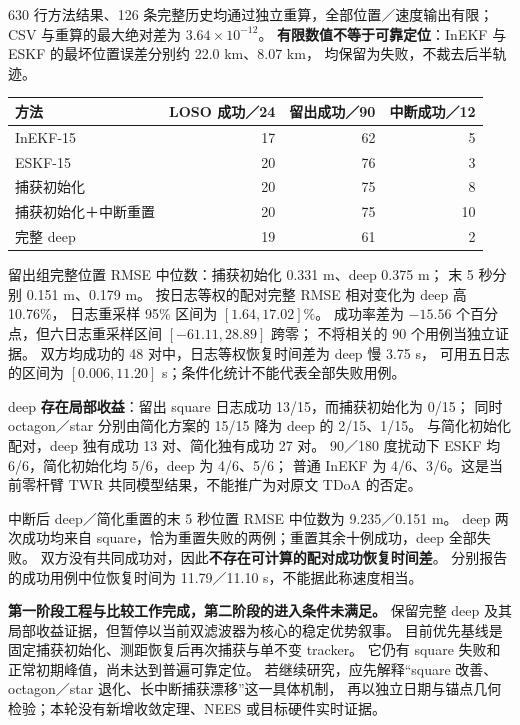 630 行方法结果、126 条完整历史均通过独立重算，全部位置／速度输出有限；
CSV 与重算的最大绝对差为 $3.64\times10^{-12}$。
\textbf{有限数值不等于可靠定位}：InEKF 与 ESKF 的最坏位置误差分别约 22.0 km、8.07 km，
均保留为失败，不裁去后半轨迹。

\begin{center}
\begin{tabular}{lrrr}
\toprule
方法&LOSO 成功／24&留出成功／90&中断成功／12\\\midrule
InEKF-15&17&62&5\\
ESKF-15&20&76&3\\
捕获初始化&20&75&8\\
捕获初始化＋中断重置&20&75&10\\
完整 deep&19&61&2\\\bottomrule
\end{tabular}
\end{center}

留出组完整位置 RMSE 中位数：捕获初始化 0.331 m、deep 0.375 m；
末 5 秒分别 0.151 m、0.179 m。
按日志等权的配对完整 RMSE 相对变化为 deep 高 10.76\%，
日志重采样 95\% 区间为 $[1.64,17.02]\%$。
成功率差为 $-15.56$ 个百分点，但六日志重采样区间 $[-61.11,28.89]$ 跨零；
不将相关的 90 个用例当独立证据。
双方均成功的 48 对中，日志等权恢复时间差为 deep 慢 3.75 s，
可用五日志的区间为 $[0.006,11.20]$ s；条件化统计不能代表全部失败用例。

deep \textbf{存在局部收益}：留出 square 日志成功 13/15，而捕获初始化为 0/15；
同时 octagon／star 分别由简化方案的 15/15 降为 deep 的 2/15、1/15。
与简化初始化配对，deep 独有成功 13 对、简化独有成功 27 对。
90／180 度扰动下 ESKF 均 6/6，简化初始化均 5/6，deep 为 4/6、5/6；
普通 InEKF 为 4/6、3/6。这是当前零杆臂 TWR 共同模型结果，不能推广为对原文 TDoA 的否定。

中断后 deep／简化重置的末 5 秒位置 RMSE 中位数为 9.235／0.151 m。
deep 两次成功均来自 square，恰为重置失败的两例；重置其余十例成功，deep 全部失败。
双方没有共同成功对，因此\textbf{不存在可计算的配对成功恢复时间差}。
分别报告的成功用例中位恢复时间为 11.79／11.10 s，不能据此称速度相当。

\textbf{第一阶段工程与比较工作完成，第二阶段的进入条件未满足。}
保留完整 deep 及其局部收益证据，但暂停以当前双滤波器为核心的稳定优势叙事。
目前优先基线是固定捕获初始化、测距恢复后再次捕获与单不变 tracker。
它仍有 square 失败和正常初期峰值，尚未达到普遍可靠定位。
若继续研究，应先解释“square 改善、octagon／star 退化、长中断捕获漂移”这一具体机制，
再以独立日期与锚点几何检验；本轮没有新增收敛定理、NEES 或目标硬件实时证据。

